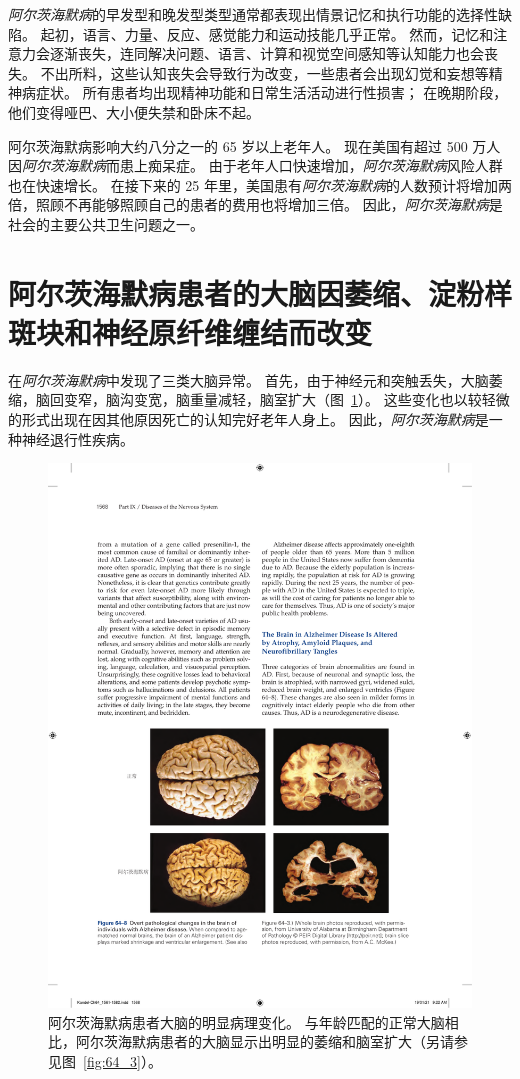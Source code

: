 \textit{阿尔茨海默病}的早发型和晚发型类型通常都表现出情景记忆和执行功能的选择性缺陷。
起初，语言、力量、反应、感觉能力和运动技能几乎正常。
然而，记忆和注意力会逐渐丧失，连同解决问题、语言、计算和视觉空间感知等认知能力也会丧失。
不出所料，这些认知丧失会导致行为改变，一些患者会出现幻觉和妄想等精神病症状。
所有患者均出现精神功能和日常生活活动进行性损害；
在晚期阶段，他们变得哑巴、大小便失禁和卧床不起。


阿尔茨海默病影响大约八分之一的 65 岁以上老年人。 现在美国有超过 500 万人因\textit{阿尔茨海默病}而患上痴呆症。
由于老年人口快速增加，\textit{阿尔茨海默病}风险人群也在快速增长。
在接下来的 25 年里，美国患有\textit{阿尔茨海默病}的人数预计将增加两倍，照顾不再能够照顾自己的患者的费用也将增加三倍。
因此，\textit{阿尔茨海默病}是社会的主要公共卫生问题之一。



\section{阿尔茨海默病患者的大脑因萎缩、淀粉样斑块和神经原纤维缠结而改变}

在\textit{阿尔茨海默病}中发现了三类大脑异常。
首先，由于神经元和突触丢失，大脑萎缩，脑回变窄，脑沟变宽，脑重量减轻，脑室扩大（图~\ref{fig:64_8}）。
这些变化也以较轻微的形式出现在因其他原因死亡的认知完好老年人身上。
因此，\textit{阿尔茨海默病}是一种神经退行性疾病。


\begin{figure}[htbp]
	\centering
	\includegraphics[width=0.98\linewidth]{chap64/fig_64_8}
	\caption{阿尔茨海默病患者大脑的明显病理变化。
		与年龄匹配的正常大脑相比，阿尔茨海默病患者的大脑显示出明显的萎缩和脑室扩大（另请参见图~\ref{fig:64_3}）。}
	\label{fig:64_8}
\end{figure}


